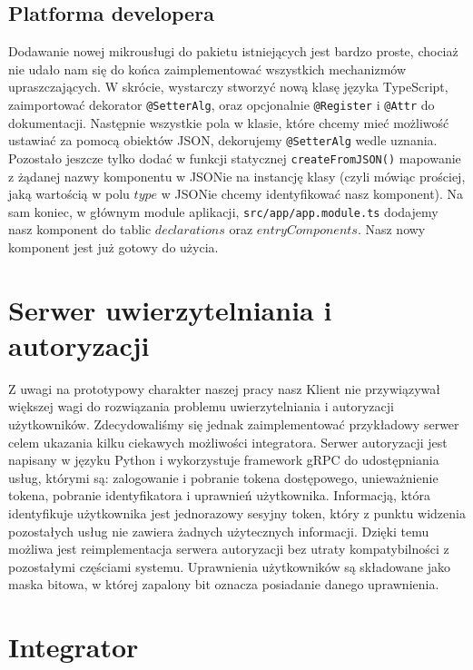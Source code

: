 \documentclass[licencjacka]{pracamgr}
\begin{document}
\subsection{Platforma developera}
Dodawanie nowej mikrousługi do pakietu istniejących jest bardzo proste, chociaż nie udało nam się do końca zaimplementować wszystkich mechanizmów upraszczających. W skrócie, wystarczy stworzyć nową klasę języka TypeScript, zaimportować dekorator \texttt{@SetterAlg}, oraz opcjonalnie \texttt{@Register} i \texttt{@Attr} do dokumentacji. Następnie wszystkie pola w klasie, które chcemy mieć możliwość ustawiać za pomocą obiektów JSON, dekorujemy \texttt{@SetterAlg} wedle uznania. Pozostało jeszcze tylko dodać w funkcji statycznej \texttt{createFromJSON()} mapowanie z żądanej nazwy komponentu w JSONie na instancję klasy (czyli mówiąc prościej, jaką wartością w polu $type$ w JSONie chcemy identyfikować nasz komponent). Na sam koniec, w głównym module aplikacji, \texttt{src/app/app.module.ts} dodajemy nasz komponent do tablic $declarations$ oraz $entryComponents$. Nasz nowy komponent jest już gotowy do użycia.

\section{Serwer uwierzytelniania i autoryzacji}

Z uwagi na prototypowy charakter naszej pracy nasz Klient nie przywiązywał większej
wagi do rozwiązania problemu uwierzytelniania i autoryzacji użytkowników. Zdecydowaliśmy
się jednak zaimplementować przykładowy serwer celem ukazania kilku ciekawych
możliwości integratora. Serwer autoryzacji jest napisany w języku Python i wykorzystuje
framework gRPC do udostępniania usług, którymi są: zalogowanie i pobranie tokena
dostępowego, unieważnienie tokena, pobranie identyfikatora i uprawnień użytkownika.
Informacją, która identyfikuje użytkownika jest jednorazowy sesyjny token, który
z punktu widzenia pozostałych usług nie zawiera żadnych użytecznych informacji.
Dzięki temu możliwa jest reimplementacja serwera autoryzacji bez utraty kompatybilności
z pozostałymi częściami systemu. Uprawnienia użytkowników są składowane jako maska
bitowa, w której zapalony bit oznacza posiadanie danego uprawnienia.

\section{Integrator}
\end{document}
